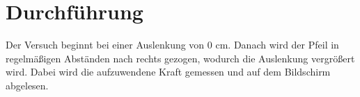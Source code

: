 \section{Durchführung}
\label{sec:Durchführung}
Der Versuch beginnt bei einer Auslenkung von 0 cm. Danach wird der Pfeil 
in regelmäßigen Abständen nach rechts gezogen, wodurch die Auslenkung 
vergrößert wird. Dabei wird die aufzuwendene Kraft gemessen und auf dem 
Bildschirm abgelesen. 